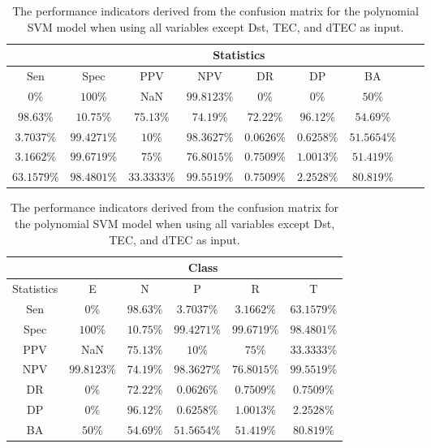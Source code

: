 \begin{table}[!ht]
	\centering
	\begin{tabular}{|c|c|c|c|c|c|c|c|c|}
		\hline
		 & \multicolumn{7}{c|}{Statistics} \\ \hline
		Sen & Spec & PPV & NPV & DR & DP & BA \\ \hline
		$0\%$ & $100\%$ & NaN & $99.8123\%$ & $0\%$ & $0\%$ & $50\%$ \\ \hline
		$98.63\%$ & $10.75\%$ & $75.13\%$ & $74.19\%$ & $72.22\%$ & $96.12\%$ & $54.69\%$ \\ \hline
		$3.7037\%$ & $99.4271\%$ & $10\%$ & $98.3627\%$ & $0.0626\%$ & $0.6258\%$ & $51.5654\%$ \\ \hline
		$3.1662\%$ & $99.6719\%$ & $75\%$ & $76.8015\%$ & $0.7509\%$ & $1.0013\%$ & $51.419\%$ \\ \hline
		$63.1579\%$ & $98.4801\%$ & $33.3333\%$ & $99.5519\%$ & $0.7509\%$ & $2.2528\%$ & $80.819\%$ \\ \hline
	\end{tabular}
	\caption{The performance indicators derived from the confusion matrix for the polynomial SVM model when using all variables except Dst, TEC, and dTEC as input.}
	\label{tab:cs:noTEC:svmPoly}
\end{table}

\begin{table}[!ht]
	\centering
	\begin{tabular}{|c|c|c|c|c|c|}
		\hline
		 & \multicolumn{5}{c|}{Class} \\ \hline
		Statistics & E & N & P & R & T \\ \hline
		Sen & $0\%$ & $98.63\%$ & $3.7037\%$ & $3.1662\%$ & $63.1579\%$ \\ \hline
		Spec & $100\%$ & $10.75\%$ & $99.4271\%$ & $99.6719\%$ & $98.4801\%$ \\ \hline
		PPV & NaN & $75.13\%$ & $10\%$ & $75\%$ & $33.3333\%$ \\ \hline
		NPV & $99.8123\%$ & $74.19\%$ & $98.3627\%$ & $76.8015\%$ & $99.5519\%$ \\ \hline
		DR & $0\%$ & $72.22\%$ & $0.0626\%$ & $0.7509\%$ & $0.7509\%$ \\ \hline
		DP & $0\%$ & $96.12\%$ & $0.6258\%$ & $1.0013\%$ & $2.2528\%$ \\ \hline
		BA & $50\%$ & $54.69\%$ & $51.5654\%$ & $51.419\%$ & $80.819\%$ \\ \hline
	\end{tabular}
	\caption{The performance indicators derived from the confusion matrix for the polynomial SVM model when using all variables except Dst, TEC, and dTEC as input.}
	\label{tab:cs:reverse:noTEC:svmPoly}
\end{table}
